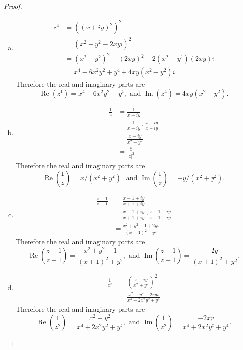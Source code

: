 \documentclass{article}
\begin{document}
\begin{proof}
  \begin{enumerate}[(a)]
    \item
    \begin{align*}
      z^4 &= ((x + iy)^2)^2 \\
      &= (x^2 - y^2 - 2xyi)^2 \\
      &= (x^2 - y^2)^2 - (2xy)^2 - 2(x^2 - y^2)(2xy)i \\
      &= x^4 - 6x^2y^2 + y^4 + 4xy(x^2-y^2)i
    \end{align*}
    Therefore the real and imaginary parts are \[
      \operatorname{Re}(z^4) = x^4 - 6x^2y^2 + y^4, \text { and }
      \operatorname{Im}(z^4) = 4xy(x^2-y^2).
    \]

    \item
    \begin{align*}
      \frac{1}{z}
      &= \frac{1}{x + iy} \\
      &= \frac{1}{x + iy} \cdot \frac{x - iy}{x - iy} \\
      &= \frac{x - iy}{x^2 + y^2} \\
      &= \frac{\bar{z}}{|z|^2}
    \end{align*}
    Therefore the real and imaginary parts are \[
      \operatorname{Re}\left(\frac{1}{z}\right)
        = x/(x^2 + y^2), \text { and }
      \operatorname{Im}\left(\frac{1}{z}\right)
        = -y/(x^2 + y^2).
    \]

    \item
    \begin{align*}
      \frac{z - 1}{z + 1}
      &= \frac{x - 1 + iy}{x + 1 + iy} \\
      &= \frac{x - 1 + iy}{x + 1 + iy} \cdot \frac{x + 1 - iy}{x + 1 - iy} \\
      &= \frac{x^2 + y^2 - 1+ 2yi}{(x + 1)^2 + y^2}
    \end{align*}
    Therefore the real and imaginary parts are \[
      \operatorname{Re}\left(\frac{z - 1}{z + 1}\right) =
        \frac{x^2 + y^2 - 1}{(x + 1)^2 + y^2}, \text { and }
      \operatorname{Im}\left(\frac{z - 1}{z + 1}\right) =
        \frac{2y}{(x + 1)^2 + y^2}.
    \]

    \item
    \begin{align*}
      \frac{1}{z^2}
      &= \left(\frac{x - iy}{x^2 + y^2}\right)^2 \\
      &= \frac{x^2 - y^2 -2xyi}{x^4 + 2x^2y^2 + y^4}
    \end{align*}
    Therefore the real and imaginary parts are \[
      \operatorname{Re}\left(\frac{1}{z^2}\right) =
        \frac{x^2 - y^2}{x^4 + 2x^2y^2 + y^4}, \text { and }
      \operatorname{Im}\left(\frac{1}{z^2}\right) =
      \frac{-2xy}{x^4 + 2x^2y^2 + y^4}.
    \]
  \end{enumerate}
\end{proof}
\end{document}
